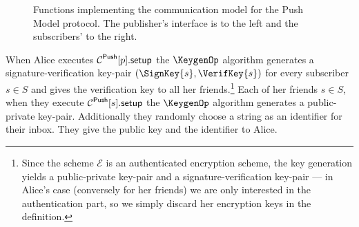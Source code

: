 \begin{figure}%
  \caption{%
    Functions implementing the communication model for the Push Model protocol.
    The publisher's interface is to the left and the subscribers' to the right.
  }\label{PushFunctions}
\end{figure}

When Alice executes \(\pnsetup{p}\) the \(\KeygenOp\) algorithm generates 
a signature-verification key-pair \((\SignKey{s}, \VerifKey{s})\) for every 
subscriber \(s\in S\) and gives the verification key to all her 
friends.\footnote{%
  Since the scheme \(\mathcal{E}\) is an authenticated encryption scheme, the 
  key generation yields a public-private key-pair and a signature-verification 
  key-pair --- in Alice's case (conversely for her friends) we are only 
  interested in the authentication part, so we simply discard her encryption 
  keys in the definition.
}
Each of her friends \(s\in S\), when they execute \(\pnsetup{s}\) the 
\(\KeygenOp\) algorithm generates a public-private key-pair.
Additionally they randomly choose a string as an identifier for their inbox.
They give the public key and the identifier to Alice.

